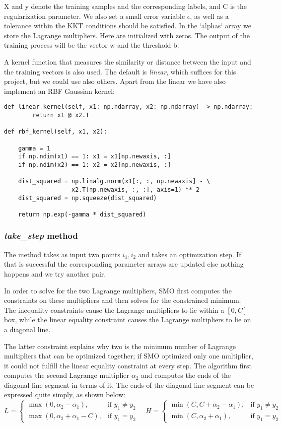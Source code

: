 \documentclass[10pt,a4paper]{article}
\newcounter{para}
\begin{document}
X and y denote the training samples and the corresponding labels, and C is the regularization parameter. We also set a small error variable $\epsilon$, as well as a tolerance within the KKT conditions should be satisfied. 
In the `alphas` array we store the Lagrange multipliers. Here are initialized with zeros. The output of the training process will be the vector w and the threshold b.

A kernel function that measures the similarity or distance between the input and the training vectors is also used. The default is \textit{linear}, which suffices for this project, but we could use also others. Apart from the linear we have also implement an RBF Gaussian kernel:
\newpage
\begin{lstlisting}
def linear_kernel(self, x1: np.ndarray, x2: np.ndarray) -> np.ndarray:
		return x1 @ x2.T

def rbf_kernel(self, x1, x2):

	gamma = 1
	if np.ndim(x1) == 1: x1 = x1[np.newaxis, :]
	if np.ndim(x2) == 1: x2 = x2[np.newaxis, :]

	dist_squared = np.linalg.norm(x1[:, :, np.newaxis] - \
				   x2.T[np.newaxis, :, :], axis=1) ** 2
	dist_squared = np.squeeze(dist_squared)

	return np.exp(-gamma * dist_squared)
\end{lstlisting}

\subsubsection{\textit{take\_step} method}

The method takes as input two points $i_1, i_2$ and takes an optimization step. If that is successful the corresponding parameter arrays are updated else nothing happens and we try another pair.

In order to solve for the two Lagrange multipliers, SMO first computes the constraints on these multipliers and then solves for the constrained minimum.  The inequality constraints cause the Lagrange multipliers to lie within a \([0,C]\) box, while the linear equality constraint causes the
Lagrange multipliers to lie on a diagonal line.

The latter constraint explains why two is the minimum number of Lagrange multipliers that can be optimized together; if SMO optimized only one multiplier, it could not fulfill the linear equality constraint at every step.
The algorithm first computes the second Lagrange multiplier \(\alpha_2\) and computes the ends of the diagonal line segment in terms of it. The ends of the diagonal line segment can be expressed quite simply, as shown below:
\[
L = \left\{
\begin{array}{ll}
	\max(0, \alpha_2 - \alpha_1), & \text{if } y_1 \neq y_2 \\
	\max(0, \alpha_2 + \alpha_1 - C), & \text{if } y_1 = y_2
\end{array}
\right.
\quad
H = \left\{
\begin{array}{ll}
	\min(C, C + \alpha_2 - \alpha_1), & \text{if } y_1 \neq y_2 \\
	\min(C, \alpha_2 + \alpha_1), & \text{if } y_1 = y_2
\end{array}
\right.
\]
\end{document}
